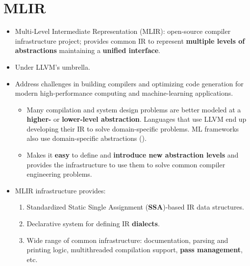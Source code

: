 \documentclass[8pt,a4paper,oneside,hidelinks,aspectratio=169,dvipsnames]{beamer}
\begin{document}
\section{MLIR}

\begin{frame}{}
  \begin{itemize}
    \item Multi-Level Intermediate Representation (MLIR): open-source compiler infrastructure project; provides common IR to represent \textbf{multiple levels of abstractions} maintaining a \textbf{unified interface}.
    \item Under LLVM's umbrella.
    \item Address challenges in building compilers and optimizing code generation for modern high-performance computing and machine-learning applications.
          \begin{itemize}
            \item Many compilation and system design problems are better modeled at a \textbf{higher-} or \textbf{lower-level abstraction}. Languages that use LLVM end up developing their IR to solve domain-specific problems. ML frameworks also use domain-specific abstractions ().
            \item Makes it \textbf{easy} to define and \textbf{introduce new abstraction levels} and provides the infrastructure to use them to solve common compiler engineering problems.
          \end{itemize}
    \item MLIR infrastructure provides:
          \begin{enumerate}
            \item Standardized Static Single Assignment (\textbf{SSA})-based IR data structures.
            \item Declarative system for defining IR \textbf{dialects}.
            \item Wide range of common infrastructure: documentation, parsing and printing logic, multithreaded compilation support, \textbf{pass management}, etc.
          \end{enumerate}
  \end{itemize}
\end{frame}
\end{document}

